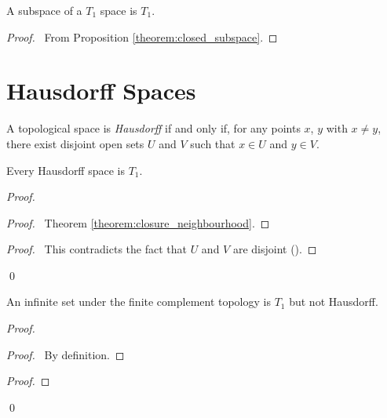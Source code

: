 \begin{proposition}
    \label{proposition:T1_subspace}
    A subspace of a $T_1$ space is $T_1$.
\end{proposition}

\begin{proof}
    \pf\ From Proposition \ref{theorem:closed_subspace}.
\end{proof}

\section{Hausdorff Spaces}

\begin{definition}
    A topological space is \emph{Hausdorff} if and only if, for any points $x$, $y$ with $x \neq y$,
    there exist disjoint open sets $U$ and $V$ such that $x \in U$ and $y \in V$.
\end{definition}

\begin{theorem}
    Every Hausdorff space is $T_1$.
\end{theorem}

\begin{proof}
    \pf
    \begin{proof}
        \pf\ Theorem \ref{theorem:closure_neighbourhood}.
    \end{proof}
    \qedstep
    \begin{proof}
        \pf\ This contradicts the fact that $U$ and $V$ are disjoint ().
    \end{proof}
    \qed
\end{proof}

\begin{proposition}
    An infinite set under the finite complement topology is $T_1$ but not Hausdorff.
\end{proposition}

\begin{proof}
    \pf
    \begin{proof}
        \pf\ By definition.
    \end{proof}
    \begin{proof}
    \end{proof}
    \qed
\end{proof}

